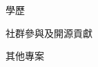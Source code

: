 \documentclass{resume} %
\begin{document}
\begin{rSection}{\Large 學歷}
\begin{rSection}{\Large 社群參與及開源貢獻}
\begin{rSection}{\Large 其他專案}
%
%
%
%
%
%
%
%
%

\end{rSection}
\end{rSection}
\end{rSection}
\end{document}
